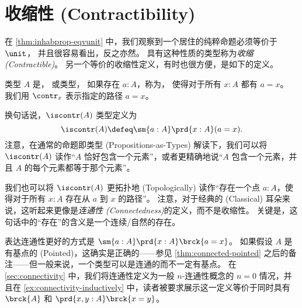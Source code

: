 %
%
\section{收缩性 (Contractibility)}
\label{sec:contractibility}

%
%

在 \cref{thm:inhabprop-eqvunit} 中，我们观察到一个居住的纯粹命题必须等价于 $\unit$，
%
并且很容易看出，反之亦然。
具有这种性质的类型称为\emph{收缩 (Contractible)}。
另一个等价的收缩性定义，有时也很方便，是如下的定义。

\begin{defn}\label{defn:contractible}
类型 $A$ 是，
或类型，
%
%
如果存在 $a:A$，称为，
%
使得对于所有 $x:A$ 都有 $a=x$。
我们用 $\contr_x$ 表示指定的路径 $a=x$。
\end{defn}

换句话说，$\iscontr(A)$ 类型定义为
\[ \iscontr(A) \defeq \sm{a:A} \prd{x:A}(a=x). \]
注意，在通常的命题即类型 (Propositions-as-Types) 解读下，我们可以将 $\iscontr(A)$ 读作“$A$ 恰好包含一个元素”，或者更精确地说“$A$ 包含一个元素，并且 $A$ 的每个元素都等于那个元素”。

\begin{rmk}
  我们也可以将 $\iscontr(A)$ 更拓扑地 (Topologically) 读作“存在一个点 $a:A$，使得对于所有 $x:A$ 存在从 $a$ 到 $x$ 的路径”。
  注意，对于经典的 (Classical) 耳朵来说，这听起来更像是\emph{连通性 (Connectedness)}的定义，而不是收缩性。
  关键是，这句话中的“存在”的含义是一个连续/自然的存在。

  表达连通性更好的方式是 $\sm{a:A}\prd{x:A} \brck{a=x}$。
  如果假设 $A$ 是有基点的 (Pointed)，这确实是正确的——参见 \cref{thm:connected-pointed} 之后的备注——但一般来说，一个类型可以是连通的而不一定有基点。
  在 \cref{sec:connectivity} 中，我们将连通性定义为一般 $n$-连通性概念的 $n=0$ 情况，并且在 \cref{ex:connectivity-inductively} 中，读者被要求展示这一定义等价于同时具有 $\brck{A}$ 和 $\prd{x,y:A} \brck{x=y}$。
\end{rmk}

